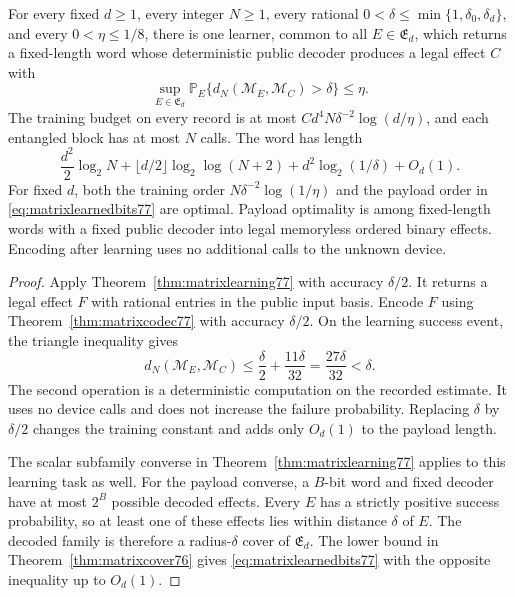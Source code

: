 \begin{corollary}
\label{cor:matrixlearnedcode77}
For every fixed $d\ge1$, every integer $N\ge1$, every rational
$0<\delta\le\min\{1,\delta_0,\delta_d\}$, and every
$0<\eta\le1/8$, there is one learner, common to all
$E\in\mathfrak E_d$, which returns a fixed-length word whose
deterministic public decoder produces a legal effect $C$ with
\[
 \sup_{E\in\mathfrak E_d}
 \mathbb P_E\{d_N(\mathcal M_E,\mathcal M_C)>\delta\}
 \le\eta.
\]
The training budget on every record is at most
$Cd^4N\delta^{-2}\log(d/\eta)$, and each entangled block has at
most $N$ calls. The word has length
\begin{equation}\label{eq:matrixlearnedbits77}
 \frac{d^2}{2}\log_2N+
 \lfloor d/2\rfloor\log_2\log(N+2)+
 d^2\log_2(1/\delta)+O_d(1).
\end{equation}
For fixed $d$, both the training order
$N\delta^{-2}\log(1/\eta)$ and the payload order in
\eqref{eq:matrixlearnedbits77} are optimal. Payload optimality is
among fixed-length words with a fixed public decoder into legal
memoryless ordered binary effects. Encoding after learning uses no
additional calls to the unknown device.
\end{corollary}
\begin{proof}
Apply Theorem~\ref{thm:matrixlearning77} with accuracy $\delta/2$.
It returns a legal effect $F$ with rational entries in the public
input basis. Encode $F$ using Theorem~\ref{thm:matrixcodec77} with
accuracy $\delta/2$. On the learning success event, the triangle
inequality gives
\[
 d_N(\mathcal M_E,\mathcal M_C)
 \le\frac\delta2+\frac{11\delta}{32}
 =\frac{27\delta}{32}<\delta.
\]
The second operation is a deterministic computation on the recorded
estimate. It uses no device calls and does not increase the failure
probability. Replacing $\delta$ by $\delta/2$ changes the training
constant and adds only $O_d(1)$ to the payload length.

The scalar subfamily converse in
Theorem~\ref{thm:matrixlearning77} applies to this learning task as
well. For the payload converse, a $B$-bit word and fixed decoder have
at most $2^B$ possible decoded effects. Every $E$ has a strictly
positive success probability, so at least one of these effects lies
within distance $\delta$ of $E$. The decoded family is therefore a
radius-$\delta$ cover of $\mathfrak E_d$. The lower bound in
Theorem~\ref{thm:matrixcover76} gives
\eqref{eq:matrixlearnedbits77} with the opposite inequality up to
$O_d(1)$.
\end{proof}
